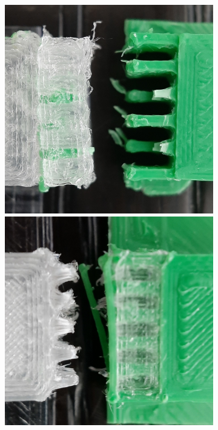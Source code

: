\begin{figure}
\begin{subfigure}[B]{.99\columnwidth}
		\includegraphics[width=\figwidth]{sources/testing/j2_cropped.jpg}
		\includegraphics[width=\figwidth]{sources/testing/j3_cropped.jpg}

\end{subfigure}
\end{figure}
